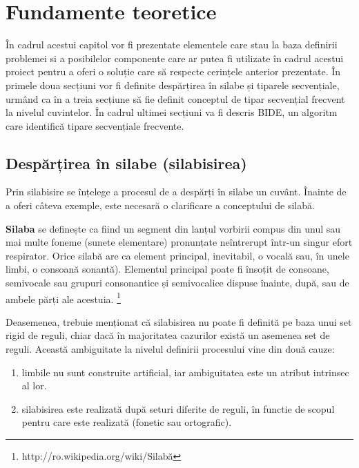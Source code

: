 \chapter{Fundamente teoretice}
\label{cap:fund-teoretice}

În cadrul acestui capitol vor fi prezentate elementele care stau la baza definirii problemei si a posibilelor componente care ar putea fi utilizate în cadrul acestui proiect pentru a oferi o soluție care să respecte cerințele anterior prezentate. În primele doua secțiuni vor fi definite despărțirea în silabe și tiparele secvențiale, urmând ca în a treia secțiune să fie definit conceptul de tipar secvențial frecvent la nivelul cuvintelor. În cadrul ultimei secțiuni va fi descris BIDE, un algoritm care identifică tipare secvențiale frecvente.

\section{Despărțirea în silabe (silabisirea)}

Prin silabisire se înțelege a procesul de a despărți în silabe un cuvânt. Înainte de a oferi câteva exemple, este necesară o clarificare a conceptului de silabă. 

\begin{defi}
\textbf{Silaba} se definește ca fiind un segment din lanțul vorbirii compus din unul sau mai multe foneme (sunete elementare) pronunțate neîntrerupt într-un singur efort respirator. Orice silabă are ca element principal, inevitabil, o vocală sau, în unele limbi, o consoană sonantă). Elementul principal poate fi însoțit de consoane, semivocale sau grupuri consonantice și semivocalice dispuse înainte, după, sau de ambele părți ale acestuia. \footnote{http://ro.wikipedia.org/wiki/Silabă}
\end{defi} 

Deasemenea, trebuie menționat că silabisirea nu poate fi definită pe baza unui set rigid de reguli, chiar dacă în majoritatea cazurilor există un asemenea set de reguli. Această ambiguitate la nivelul definirii procesului vine din două cauze: 
\begin{enumerate}
\item limbile nu sunt construite artificial, iar ambiguitatea este un atribut intrinsec al lor. 
\item silabisirea este realizată după seturi diferite de reguli, în functie de scopul pentru care este realizată (fonetic sau ortografic).  
\end{enumerate}

